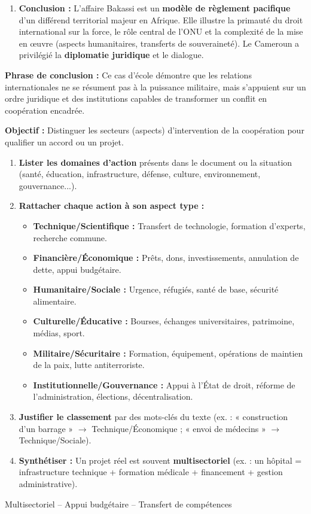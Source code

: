 \documentclass[11pt]{article}
\newcommand{\cle}[1]{{\popxbold\color{popdark}#1}}
\begin{document}
\begin{exoresolu}
\begin{enumerate}
    \item \textbf{Conclusion :} L'affaire Bakassi est un \textbf{modèle de règlement pacifique} d'un différend territorial majeur en Afrique. Elle illustre la primauté du droit international sur la force, le rôle central de l'ONU et la complexité de la mise en œuvre (aspects humanitaires, transferts de souveraineté). Le Cameroun a privilégié la \textbf{diplomatie juridique} et le dialogue.
\end{enumerate}
\textbf{Phrase de conclusion :} Ce cas d'école démontre que les relations internationales ne se résument pas à la puissance militaire, mais s'appuient sur un ordre juridique et des institutions capables de transformer un conflit en coopération encadrée.
\end{exoresolu}

\begin{methode}
\textbf{Objectif :} Distinguer les secteurs (aspects) d'intervention de la coopération pour qualifier un accord ou un projet.
\begin{enumerate}
    \item \textbf{Lister les domaines d'action} présents dans le document ou la situation (santé, éducation, infrastructure, défense, culture, environnement, gouvernance...).
    \item \textbf{Rattacher chaque action à son aspect type :}
    \begin{itemize}
        \item \textbf{Technique/Scientifique :} Transfert de technologie, formation d'experts, recherche commune.
        \item \textbf{Financière/Économique :} Prêts, dons, investissements, annulation de dette, appui budgétaire.
        \item \textbf{Humanitaire/Sociale :} Urgence, réfugiés, santé de base, sécurité alimentaire.
        \item \textbf{Culturelle/Éducative :} Bourses, échanges universitaires, patrimoine, médias, sport.
        \item \textbf{Militaire/Sécuritaire :} Formation, équipement, opérations de maintien de la paix, lutte antiterroriste.
        \item \textbf{Institutionnelle/Gouvernance :} Appui à l'État de droit, réforme de l'administration, élections, décentralisation.
    \end{itemize}
    \item \textbf{Justifier le classement} par des mots-clés du texte (ex. : « construction d'un barrage » $\rightarrow$ Technique/Économique ; « envoi de médecins » $\rightarrow$ Technique/Sociale).
    \item \textbf{Synthétiser :} Un projet réel est souvent \textbf{multisectoriel} (ex. : un hôpital = infrastructure technique + formation médicale + financement + gestion administrative).
\end{enumerate}
\cle{Multisectoriel} -- \cle{Appui budgétaire} -- \cle{Transfert de compétences}
\end{methode}
\end{document}
